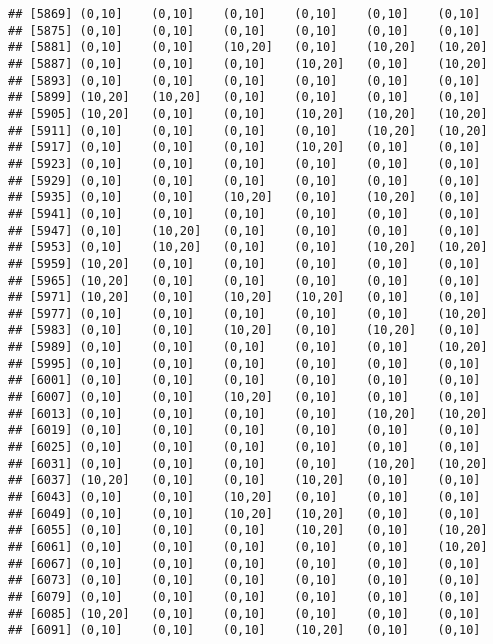 \documentclass[]{article}
\begin{document}
\begin{verbatim}
## [5869] (0,10]    (0,10]    (0,10]    (0,10]    (0,10]    (0,10]   
## [5875] (0,10]    (0,10]    (0,10]    (0,10]    (0,10]    (0,10]   
## [5881] (0,10]    (0,10]    (10,20]   (0,10]    (10,20]   (10,20]  
## [5887] (0,10]    (0,10]    (0,10]    (10,20]   (0,10]    (10,20]  
## [5893] (0,10]    (0,10]    (0,10]    (0,10]    (0,10]    (0,10]   
## [5899] (10,20]   (10,20]   (0,10]    (0,10]    (0,10]    (0,10]   
## [5905] (10,20]   (0,10]    (0,10]    (10,20]   (10,20]   (10,20]  
## [5911] (0,10]    (0,10]    (0,10]    (0,10]    (10,20]   (10,20]  
## [5917] (0,10]    (0,10]    (0,10]    (10,20]   (0,10]    (0,10]   
## [5923] (0,10]    (0,10]    (0,10]    (0,10]    (0,10]    (0,10]   
## [5929] (0,10]    (0,10]    (0,10]    (0,10]    (0,10]    (0,10]   
## [5935] (0,10]    (0,10]    (10,20]   (0,10]    (10,20]   (0,10]   
## [5941] (0,10]    (0,10]    (0,10]    (0,10]    (0,10]    (0,10]   
## [5947] (0,10]    (10,20]   (0,10]    (0,10]    (0,10]    (0,10]   
## [5953] (0,10]    (10,20]   (0,10]    (0,10]    (10,20]   (10,20]  
## [5959] (10,20]   (0,10]    (0,10]    (0,10]    (0,10]    (0,10]   
## [5965] (10,20]   (0,10]    (0,10]    (0,10]    (0,10]    (0,10]   
## [5971] (10,20]   (0,10]    (10,20]   (10,20]   (0,10]    (0,10]   
## [5977] (0,10]    (0,10]    (0,10]    (0,10]    (0,10]    (10,20]  
## [5983] (0,10]    (0,10]    (10,20]   (0,10]    (10,20]   (0,10]   
## [5989] (0,10]    (0,10]    (0,10]    (0,10]    (0,10]    (10,20]  
## [5995] (0,10]    (0,10]    (0,10]    (0,10]    (0,10]    (0,10]   
## [6001] (0,10]    (0,10]    (0,10]    (0,10]    (0,10]    (0,10]   
## [6007] (0,10]    (0,10]    (10,20]   (0,10]    (0,10]    (0,10]   
## [6013] (0,10]    (0,10]    (0,10]    (0,10]    (10,20]   (10,20]  
## [6019] (0,10]    (0,10]    (0,10]    (0,10]    (0,10]    (0,10]   
## [6025] (0,10]    (0,10]    (0,10]    (0,10]    (0,10]    (0,10]   
## [6031] (0,10]    (0,10]    (0,10]    (0,10]    (10,20]   (10,20]  
## [6037] (10,20]   (0,10]    (0,10]    (10,20]   (0,10]    (0,10]   
## [6043] (0,10]    (0,10]    (10,20]   (0,10]    (0,10]    (0,10]   
## [6049] (0,10]    (0,10]    (10,20]   (10,20]   (0,10]    (0,10]   
## [6055] (0,10]    (0,10]    (0,10]    (10,20]   (0,10]    (10,20]  
## [6061] (0,10]    (0,10]    (0,10]    (0,10]    (0,10]    (10,20]  
## [6067] (0,10]    (0,10]    (0,10]    (0,10]    (0,10]    (0,10]   
## [6073] (0,10]    (0,10]    (0,10]    (0,10]    (0,10]    (0,10]   
## [6079] (0,10]    (0,10]    (0,10]    (0,10]    (0,10]    (0,10]   
## [6085] (10,20]   (0,10]    (0,10]    (0,10]    (0,10]    (0,10]   
## [6091] (0,10]    (0,10]    (0,10]    (10,20]   (0,10]    (0,10]   

\end{verbatim}
\end{document}

